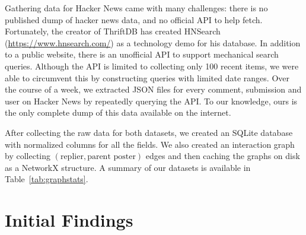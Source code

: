 \documentclass[10pt]{article}
\begin{document}
Gathering data for Hacker News came with many challenges: there is no published
dump of hacker news data, and no official API to help fetch. Fortunately, the creator
of ThriftDB has created HNSearch (\url{https://www.hnsearch.com/}) as a technology
demo for his database. In addition to a public website, there is an unofficial API
to support mechanical search queries. Although the API is limited to collecting 
only 100 recent items, we were able to circumvent this by constructing queries with limited
date ranges. Over the course of a week, we extracted JSON files for every comment,
submission and user on Hacker News by repeatedly querying the API. To our knowledge,
ours is the only complete dump of this data available on the internet.


After collecting the raw data for both datasets, we created an SQLite database
with normalized columns for all the fields. We also created an interaction graph
by collecting $(\text{replier}, \text{parent poster})$ edges and then caching the graphs
on disk as a NetworkX structure. A summary of our datasets is available in 
Table~\ref{tab:graphstats}.

\section{Initial Findings}
\end{document}
